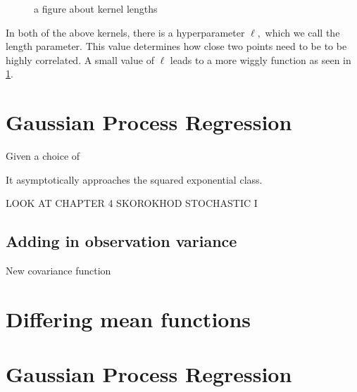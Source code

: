 \begin{figure}
    \caption{a figure about kernel lengths}
    \label{fig:no_reg_lengths}
\end{figure}

In both of the above kernels, there is a hyperparameter $\ell,$ which we call the length parameter. This value determines how close two points need to be to be highly correlated. A small value of $\ell$ leads to a more wiggly function as seen in \ref{fig:no_reg_lengths}.

\section{Gaussian Process Regression}

Given a choice of


\begin{figure}
\end{figure}


\begin{figure}
\end{figure}

It asymptotically approaches the squared exponential class.

LOOK AT CHAPTER 4 SKOROKHOD STOCHASTIC I

\subsection*{Adding in observation variance}

\begin{figure}
\end{figure}

New covariance function

\section{Differing mean functions}



\begin{figure}
\end{figure}


\section{Gaussian Process Regression}


